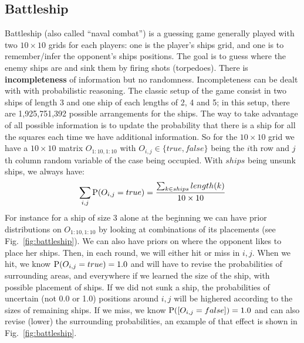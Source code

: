 \subsection{Battleship}
Battleship (also called ``naval combat'') is a guessing game generally played with two $10\times10$ grids for each players: one is the player's ships grid, and one is to remember/infer the opponent's ships positions. The goal is to guess where the enemy ships are and sink them by firing shots (torpedoes). There is \textbf{incompleteness} of information but no randomness. Incompleteness can be dealt with with probabilistic reasoning. The classic setup of the game consist in two ships of length 3 and one ship of each lengths of 2, 4 and 5; in this setup, there are 1,925,751,392 possible arrangements for the ships. The way to take advantage of all possible information is to update the probability that there is a ship for all the squares each time we have additional information. So for the $10\times10$ grid we have a $10\times10$ matrix $O_{1:10,1:10}$ with $O_{i,j} \in \{true,false\}$ being the $i$th row and $j$th column random variable of the case being occupied. With $ships$ being unsunk ships, we always have: $$\sum_{i,j}\mathrm{P}(O_{i,j}=true) = \frac{\sum_{k\in ships}length(k)}{10 \times 10}$$ For instance for a ship of size 3 alone at the beginning we can have prior distributions on $O_{1:10,1:10}$ by looking at combinations of its placements (see Fig.~\ref{fig:battleship}). We can also have priors on where the opponent likes to place her ships. Then, in each round, we will either hit or miss in $i,j$. When we hit, we know $\mathrm{P}(O_{i,j}=true)=1.0$ and will have to revise the probabilities of surrounding areas, and everywhere if we learned the size of the ship, with possible placement of ships. If we did not sunk a ship, the probabilities of uncertain (not 0.0 or 1.0) positions around $i,j$ will be highered according to the sizes of remaining ships. If we miss, we know $\mathrm{P}([O_{i,j}=false])=1.0$ and can also revise (lower) the surrounding probabilities, an example of that effect is shown in Fig.~\ref{fig:battleship}. 

